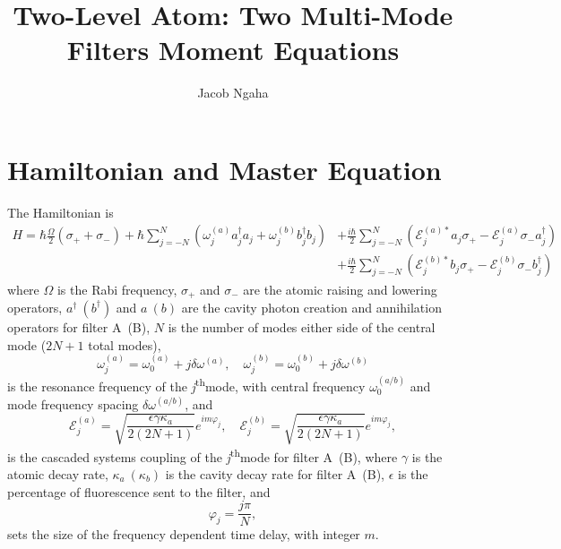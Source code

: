 \documentclass{article}
\title{Two-Level Atom: Two Multi-Mode Filters Moment Equations}
\author{Jacob Ngaha}
\newcommand{\ssth}{\textsuperscript{th}}
\begin{document}
\maketitle

\section{Hamiltonian and Master Equation}

The Hamiltonian is
\begin{align}\label{hamiltonian}
	H = \hbar \frac{\Omega}{2} \left(\sigma_{+} + \sigma_{-}\right) + \hbar \sum_{j=-N}^{N} \left( \omega_{j}^{(a)} a^{\dagger}_{j} a_{j} + \omega_{j}^{(b)} b^{\dagger}_{j} b_{j} \right) &+ \frac{i \hbar}{2} \sum_{j=-N}^{N} \left( \mathcal{E}_{j}^{(a) *} a_{j} \sigma_{+} - \mathcal{E}_{j}^{(a)} \sigma_{-} a^{\dagger}_{j} \right) \nonumber \\
	&+ \frac{i \hbar}{2} \sum_{j=-N}^{N} \left( \mathcal{E}_{j}^{(b) *} b_{j} \sigma_{+} - \mathcal{E}_{j}^{(b)} \sigma_{-} b^{\dagger}_{j} \right)
\end{align}
where $\Omega$ is the Rabi frequency, $\sigma_{+}$ and $\sigma_{-}$ are the atomic raising and lowering operators, $a^{\dagger}~(b^{\dagger})$ and $a~(b)$ are the cavity photon creation and annihilation operators for filter A~(B), $N$ is the number of modes either side of the central mode ($2N+1$ total modes),
\begin{equation}
	\omega_{j}^{(a)} = \omega_{0}^{(a)} + j \delta\omega^{(a)}, \quad \omega_{j}^{(b)} = \omega_{0}^{(b)} + j \delta\omega^{(b)}
\end{equation}
is the resonance frequency of the \textit{j}\ssth mode, with central frequency $\omega_{0}^{(a/b)}$ and mode frequency spacing $\delta\omega^{(a/b)}$, and
\begin{equation}
	\mathcal{E}_{j}^{(a)} = \sqrt{\frac{\epsilon \gamma \kappa_{a}}{2 \left( 2N + 1 \right)}} e^{i m \varphi_{j}}, \quad \mathcal{E}_{j}^{(b)} = \sqrt{\frac{\epsilon \gamma \kappa_{a}}{2 \left( 2N + 1 \right)}} e^{i m \varphi_{j}},
\end{equation}
is the cascaded systems coupling of the \textit{j}\ssth mode for filter A~(B), where $\gamma$ is the atomic decay rate, $\kappa_{a}~(\kappa_{b})$ is the cavity decay rate for filter A~(B), $\epsilon$ is the percentage of fluorescence sent to the filter, and
\begin{equation}
	\varphi_{j} = \frac{j \pi}{N},
\end{equation}
sets the size of the frequency dependent time delay, with integer $m$.
\end{document}
